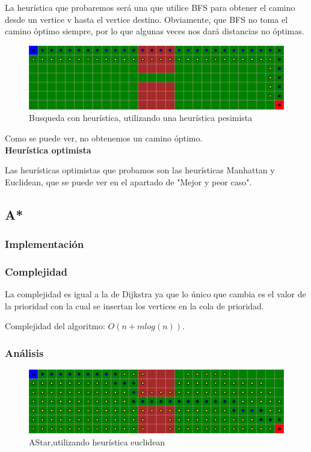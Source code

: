 La heurística que probaremos será una que utilice BFS para obtener el camino desde un vertice v hasta el vertice destino. Obviamente, que BFS no toma el camino óptimo siempre, por lo que algunas veces nos dará distancias no óptimas.

\begin{figure}[H]
\centering
\includegraphics[width=\textwidth]{BestSearch/grafo1HeuristicaPesimista.png}
\caption{Busqueda con heurística, utilizando una heurística pesimista}
\end{figure}
Como se puede ver, no obtenemos un camino óptimo.
\\

\textbf{Heurística optimista}

Las heurísticas optimistas que probamos son las heurísticas Manhattan y Euclidean, que se puede ver en el apartado de "Mejor y peor caso".
\newpage

\subsection{A*}
\subsubsection{Implementación}

\subsubsection{Complejidad}
La complejidad es igual a la de Dijkstra ya que lo único que cambia es el valor de la prioridad con la cual se insertan los vertices en la cola de prioridad.

Complejidad del algoritmo: $O(n + mlog(n))$.

\subsubsection{Análisis}
\begin{figure}[H]
\centering
\includegraphics[width=\textwidth]{AStar/grafo1HeuristicaEuclidean.png}
\caption{AStar,utilizando heurística euclidean}
\end{figure}


